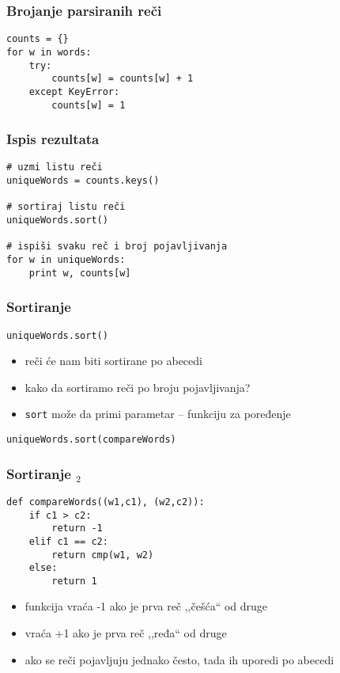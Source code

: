 \documentclass[utf8,compress]{beamer}
\begin{document}
\begin{frame}[fragile]
  \frametitle{Brojanje parsiranih reči}
\begin{verbatim}
counts = {}
for w in words:
    try:
        counts[w] = counts[w] + 1
    except KeyError:
        counts[w] = 1
\end{verbatim}
\end{frame}

\begin{frame}[fragile]
  \frametitle{Ispis rezultata}
\begin{verbatim}
# uzmi listu reči
uniqueWords = counts.keys()

# sortiraj listu reči
uniqueWords.sort()

# ispiši svaku reč i broj pojavljivanja
for w in uniqueWords:
    print w, counts[w]
\end{verbatim}
\end{frame}

\begin{frame}[fragile]
  \frametitle{Sortiranje}
\begin{verbatim}
uniqueWords.sort()
\end{verbatim}
  \begin{itemize}
    \item reči će nam biti sortirane po abecedi
    \item kako da sortiramo reči po broju pojavljivanja?
    \item \texttt{sort} može da primi parametar -- funkciju za poređenje
  \end{itemize}
\begin{verbatim}
uniqueWords.sort(compareWords)
\end{verbatim}
\end{frame}

\begin{frame}[fragile]
  \frametitle{Sortiranje $_2$}
\begin{verbatim}
def compareWords((w1,c1), (w2,c2)):
    if c1 > c2:
        return -1
    elif c1 == c2:
        return cmp(w1, w2)
    else:
        return 1
\end{verbatim}
  \begin{itemize}
    \item funkcija vraća -1 ako je prva reč ,,češća`` od druge
    \item vraća +1 ako je prva reč ,,ređa`` od druge
    \item ako se reči pojavljuju jednako često, tada ih uporedi po abecedi
  \end{itemize}
\end{frame}
\end{document}

